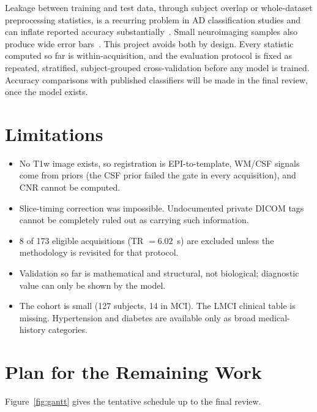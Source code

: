 \documentclass{ssnreview}
\begin{document}
Leakage between training and test data, through subject overlap or
whole-dataset preprocessing statistics, is a recurring problem in AD
classification studies and can inflate reported accuracy
substantially~\cite{wen2020}. Small neuroimaging samples also produce wide
error bars~\cite{varoquaux2018}. This project avoids both by design. Every
statistic computed so far is within-acquisition, and the evaluation protocol
is fixed as repeated, stratified, subject-grouped cross-validation before any
model is trained. Accuracy comparisons with published classifiers will be made
in the final review, once the model exists.

\section{Limitations}
\begin{itemize}
  \item No T1w image exists, so registration is EPI-to-template, WM/CSF signals
        come from priors (the CSF prior failed the gate in every
        acquisition), and CNR cannot be computed.
  \item Slice-timing correction was impossible. Undocumented private DICOM tags
        cannot be completely ruled out as carrying such information.
  \item 8 of 173 eligible acquisitions (TR $=6.02$~s) are excluded unless the
        methodology is revisited for that protocol.
  \item Validation so far is mathematical and structural, not biological;
        diagnostic value can only be shown by the model.
  \item The cohort is small (127 subjects, 14 in MCI). The LMCI clinical
        table is missing. Hypertension and diabetes are available only as
        broad medical-history categories.
\end{itemize}

\section{Plan for the Remaining Work}\label{sec:plan}
Figure~\ref{fig:gantt} gives the tentative schedule up to the final review.
\end{document}
